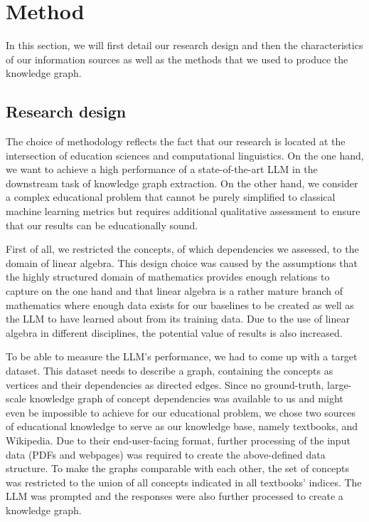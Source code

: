 \documentclass{article}
\begin{document}
\section{Method}
In this section, we will first detail our research design and then the characteristics of our information sources as well as the methods that we used to produce the knowledge graph. 

\subsection{Research design} 
The choice of methodology reflects the fact that our research is located at the intersection of education sciences and computational linguistics. On the one hand, we want to achieve a high performance of a state-of-the-art LLM in the downstream task of knowledge graph extraction. On the other hand, we consider a complex educational problem that cannot be purely simplified to classical machine learning metrics but requires additional qualitative assessment to ensure that our results can be educationally sound.

First of all, we restricted the concepts, of which dependencies we assessed, to the domain of linear algebra. This design choice was caused by the assumptions that the highly structured domain of mathematics provides enough relations to capture on the one hand and that linear algebra is a rather mature branch of mathematics where enough data exists for our baselines to be created as well as the LLM to have learned about from its training data. Due to the use of linear algebra in different disciplines, the potential value of results is also increased.

To be able to measure the LLM's performance, we had to come up with a target dataset. This dataset needs to describe a graph, containing the concepts as vertices and their dependencies as directed edges. Since no ground-truth, large-scale knowledge graph of concept dependencies was available to us and might even be impossible to achieve for our educational problem, we chose two sources of educational knowledge to serve as our knowledge base, namely textbooks, and Wikipedia. Due to their end-user-facing format, further processing of the input data (PDFs and webpages) was required to create the above-defined data structure. To make the graphs comparable with each other, the set of concepts was restricted to the union of all concepts indicated in all textbooks' indices. The LLM was prompted and the responses were also further processed to create a knowledge graph.
\end{document}
